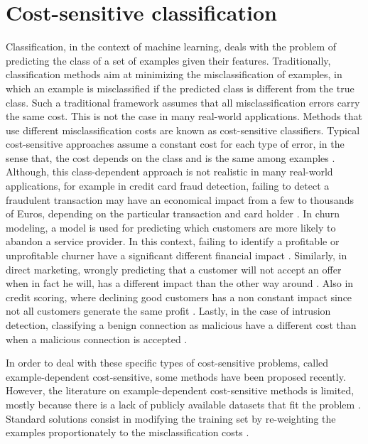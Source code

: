 \section{Cost-sensitive classification}\label{sec:2:cs}
  Classification, in the context of machine learning, deals with the problem of predicting the class
  of a set of examples given their features. Traditionally, classification methods aim at 
  minimizing the misclassification of examples, in which an example is misclassified if the 
  predicted class is different from the true class. Such a traditional framework assumes that all 
  misclassification errors carry the same cost. This is not the case in many real-world 
  applications. Methods that use different misclassification costs are known as cost-sensitive 
  classifiers. Typical cost-sensitive approaches assume a constant cost for each type of error, in 
  the sense that, the cost depends on the class and is the same among examples 
  \citep{Elkan2001,Kim2012}. 
  Although, this class-dependent approach is not realistic in many real-world applications, for 
  example in credit card fraud detection, failing to detect a fraudulent transaction may have an 
  economical impact from a few to thousands of Euros, depending on the particular transaction and 
  card holder \citep{Sahin2013}. In churn modeling, a model is used for predicting which
  customers are more likely to abandon a service provider. In this context, failing to identify a 
  profitable or unprofitable churner have a significant different financial impact 
  \citep{Glady2009}. Similarly, in direct marketing, wrongly predicting that a customer will not 
  accept an offer when in fact he will, has a different impact than the other way around 
  \citep{Zadrozny2003}. Also in credit scoring, where declining good customers has a non constant 
  impact since not all  customers generate the same profit \citep{Verbraken2014}. Lastly, in the 
  case of intrusion   detection, classifying a benign connection as malicious have a different cost 
  than when a   malicious connection is accepted \citep{Ma2011}.

  In order to deal with these specific types of cost-sensitive problems, called example-dependent
  cost-sensitive, some methods have been proposed recently. However, the literature on 
  example-dependent cost-sensitive methods is limited, mostly because there is a lack of publicly 
  available datasets that fit the problem \citep{MacAodha2013}. Standard solutions consist in 
  modifying the training set by re-weighting the examples proportionately to the misclassification 
  costs \citep{Elkan2001,Zadrozny2003}.

